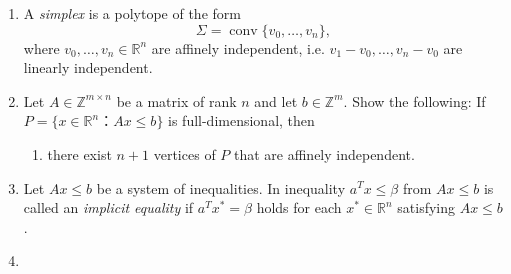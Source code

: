 \documentclass[11pt]{article}
\institute{\'Ecole Polytechnique F\'ed\'erale de Lausanne}
\DeclareMathOperator{\conv}{conv}
\begin{document}
\makeheader

\begin{enumerate}[1)]

\item A \emph{simplex}  is a polytope of the form
  \begin{displaymath}
    Σ = \conv\{v_0,\dots,v_n\}, 
    \end{displaymath}
    where $v_0,\dots,v_n ∈ ℝ^n$ are affinely independent, i.e. $v_1-v_0, \dots,v_n - v_0$ are linearly independent.

    
\item Let $A ∈ ℤ^{m ×n}$ be a matrix of rank $n$ and let $b ∈ ℤ^m$. Show the following: If $P = \{ x ∈ ℝ^n ： Ax ≤ b\}$ is full-dimensional, then
  \begin{enumerate}
  \item   there exist $n+1$ vertices of $P$ that are affinely independent. 
  \end{enumerate}
\item Let $Ax ≤b$ be a system of inequalities.  %
  In inequality $a^T x ≤ β$ from $Ax ≤b$ is called an \emph{implicit equality} if
    $a^T x^*  = β$ holds for each $x^* ∈ ℝ^n$ satisfying $Ax ≤b$. %
    
    
\item 

  





\end{enumerate}




  
\end{document}
